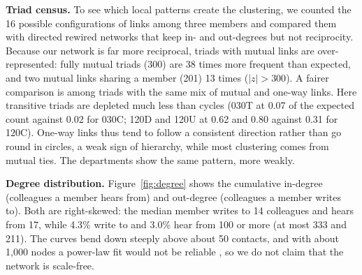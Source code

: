 \documentclass[12pt, a4paper]{article}
\begin{document}
\textbf{Triad census.} To see which local patterns create the clustering, we
counted the 16 possible configurations of links among three members
\cite{borgatti2018} and compared them with directed rewired networks that keep
in- and out-degrees but not reciprocity. Because our network is far more
reciprocal, triads with mutual links are over-represented: fully mutual triads
(300) are 38 times more frequent than expected, and two mutual links sharing a
member (201) 13 times ($|z|>300$). A fairer comparison is among triads with
the same mix of mutual and one-way links. Here transitive triads are depleted
much less than cycles (030T at 0.07 of the expected count against 0.02 for
030C; 120D and 120U at 0.62 and 0.80 against 0.31 for 120C). One-way links
thus tend to follow a consistent direction rather than go round in circles, a
weak sign of hierarchy, while most clustering comes from mutual ties. The
departments show the same pattern, more weakly.

\textbf{Degree distribution.} Figure~\ref{fig:degree} shows the cumulative
in-degree (colleagues a member hears from) and out-degree (colleagues a member
writes to). Both are right-skewed: the median member writes to 14 colleagues
and hears from 17, while 4.3\% write to and 3.0\% hear from 100 or more (at
most 333 and 211). The curves bend down steeply above about 50 contacts, and
with about 1{,}000 nodes a power-law fit would not be reliable
\cite{newman2018}, so we do not claim that the network is scale-free.
\end{document}
